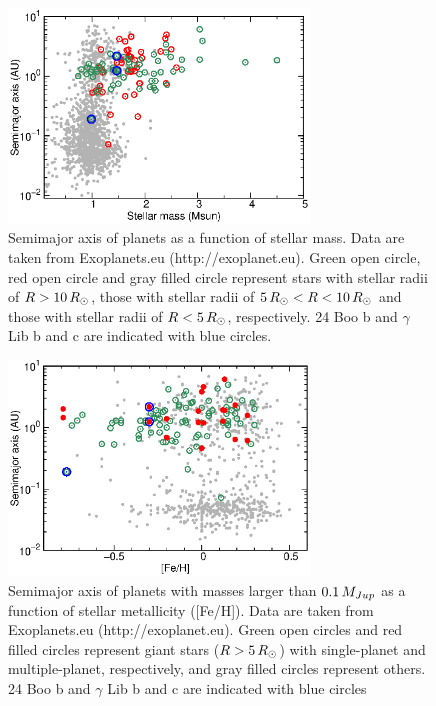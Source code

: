 \documentclass[]{pasj01}
\begin{document}
\begin{figure}
\begin{center}
\includegraphics[width=8cm]{mass_semi.eps}
\end{center}
\caption{Semimajor axis of planets as a function of stellar mass. Data are taken from Exoplanets.eu (http://exoplanet.eu). Green open circle, red open circle and gray filled circle represent stars with stellar radii of $R>10\,R_{\solar}$, those with stellar radii of $5\,R_{\solar}<R<10\,R_{\solar}$ and those with stellar radii of $R< 5\,R_{\solar}$, respectively. 24 Boo b and $\gamma$ Lib b and c are indicated with blue circles.}
\label{mass_semi}
\end{figure}

\begin{figure}
\begin{center}
\includegraphics[width=8cm]{feh_semi.v2.eps}
\end{center}
\caption{
Semimajor axis of planets with masses larger than $0.1\,M_{\rm Jup}$ as a function of stellar metallicity ([Fe/H]). 
Data are taken from Exoplanets.eu (http://exoplanet.eu). 
Green open circles and red filled circles represent giant stars ($R>5\,R_{\solar}$) with single-planet and multiple-planet, respectively, and gray filled circles represent others. 
24 Boo b and $\gamma$ Lib b and c are indicated with blue circles}
\label{feh_semi}
\end{figure}
\end{document}
